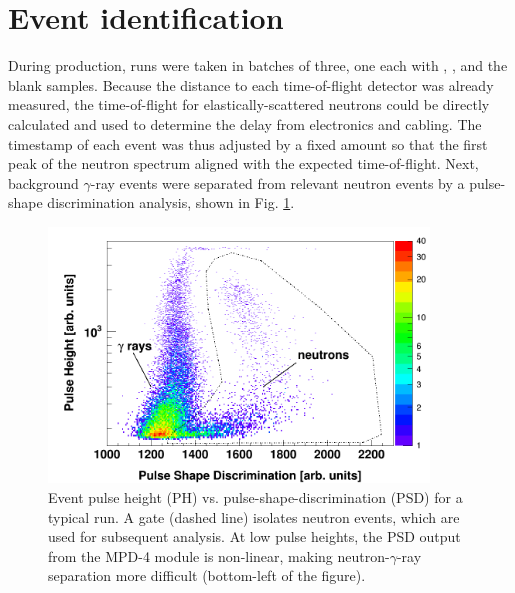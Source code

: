 \section{Event identification}
During production, runs were taken in batches of three, one each with \snTwelve,
\snFour, and the blank samples. Because the distance to each time-of-flight detector
was already measured, the time-of-flight for elastically-scattered neutrons could
be directly calculated and used to determine the delay from electronics and cabling.
The timestamp of each event was thus adjusted by a fixed amount
so that the first peak of the neutron spectrum aligned with the expected
time-of-flight. Next, background $\gamma$-ray events were separated from relevant
neutron events by a pulse-shape discrimination analysis, shown in Fig. \ref{PHPSDPlot}.

\begin{figure}[tb]
    \centering
    \includegraphics[width=0.9\textwidth]{figures/PHPSDPlot.png}
    \caption[Event pulse height (PH) vs. pulse-shape-discrimination (PSD) for
    a typical run]
    {
        Event pulse height (PH) vs. pulse-shape-discrimination (PSD) for
        a typical run. A gate (dashed line) isolates neutron events, which are
        used for subsequent analysis. At low pulse heights, the PSD output from the
        MPD-4 module is non-linear, making neutron-$\gamma$-ray separation more difficult
        (bottom-left of the figure).
    }
    \label{PHPSDPlot}
\end{figure}

